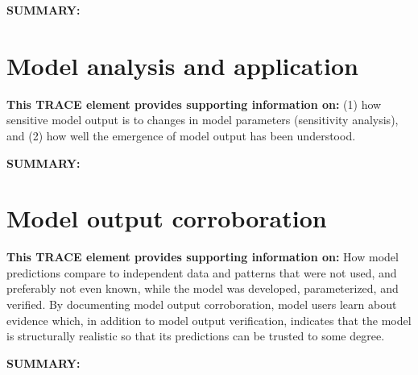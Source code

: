 \documentclass[a4paper, 11pt, parskip = full]{scrartcl}
\begin{document}
\textbf{SUMMARY:}
\begin{addmargin}[3em]{2em}
\textbf{

}
\end{addmargin}



\clearpage
\section{Model analysis and application}
\textbf{This TRACE element provides supporting information on:} (1) how sensitive model output is to changes in model
parameters (sensitivity analysis), and (2) how well the emergence of model output has been understood.

\textbf{SUMMARY:}
\begin{addmargin}[3em]{2em}
\textbf{

}
\end{addmargin}



\clearpage
\section{Model output corroboration}
\textbf{This TRACE element provides supporting information on:} How model predictions compare to independent data and
patterns
that were not used, and preferably not even known, while the model was developed, parameterized, and verified. By
documenting model output corroboration, model users learn about evidence which, in addition to model output
verification, indicates that the model is structurally realistic so that its predictions can be trusted to some degree.

\textbf{SUMMARY:}
\begin{addmargin}[3em]{2em}
\textbf{

}
\end{addmargin}



\newpage
\printbibliography[heading = bibintoc, title = {Contents}]
\end{document}
